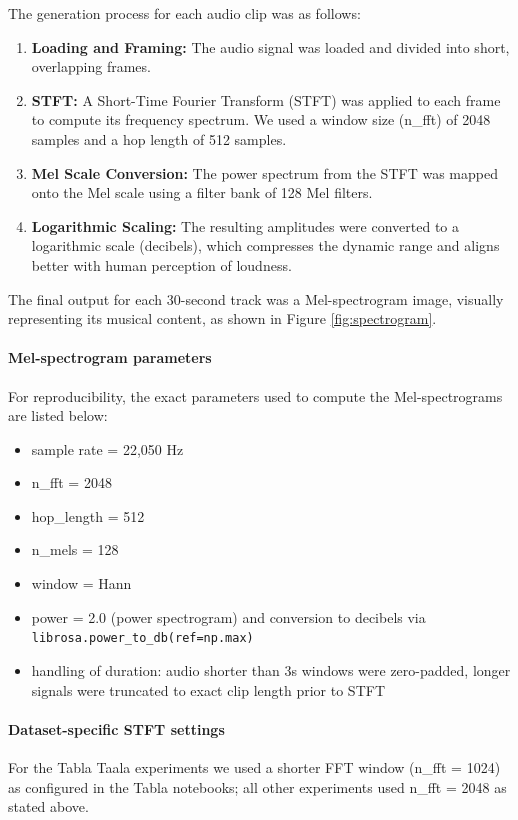 \documentclass[11pt,a4paper]{article}
\begin{document}
The generation process for each audio clip was as follows:
\begin{enumerate}
    \item \textbf{Loading and Framing:} The audio signal was loaded and divided into short, overlapping frames.
    \item \textbf{STFT:} A Short-Time Fourier Transform (STFT) was applied to each frame to compute its frequency spectrum. We used a window size (n\_fft) of 2048 samples and a hop length of 512 samples.
    \item \textbf{Mel Scale Conversion:} The power spectrum from the STFT was mapped onto the Mel scale using a filter bank of 128 Mel filters.
    \item \textbf{Logarithmic Scaling:} The resulting amplitudes were converted to a logarithmic scale (decibels), which compresses the dynamic range and aligns better with human perception of loudness.
\end{enumerate}
The final output for each 30-second track was a Mel-spectrogram image, visually representing its musical content, as shown in Figure \ref{fig:spectrogram}.

\paragraph{Mel-spectrogram parameters}
For reproducibility, the exact parameters used to compute the Mel-spectrograms are listed below:
\begin{itemize}
    \item sample rate = 22,050 Hz
    \item n\_fft = 2048
    \item hop\_length = 512
    \item n\_mels = 128
    \item window = Hann
    \item power = 2.0 (power spectrogram) and conversion to decibels via \texttt{librosa.power\_to\_db(ref=np.max)}
    \item handling of duration: audio shorter than 3s windows were zero-padded, longer signals were truncated to exact clip length prior to STFT
\end{itemize}
\paragraph{Dataset-specific STFT settings}
For the Tabla Taala experiments we used a shorter FFT window (n\_fft = 1024) as configured in the Tabla notebooks; all other experiments used n\_fft = 2048 as stated above.
\end{document}
